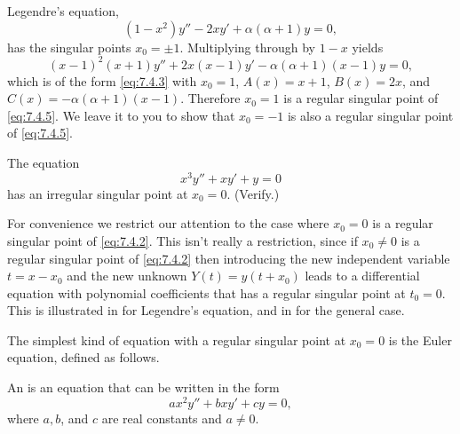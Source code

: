 \begin{example}\label{example:7.4.2}
Legendre's equation,
\begin{equation} \label{eq:7.4.5}
(1-x^2)y''-2xy'+\alpha(\alpha+1)y=0,
\end{equation}
has the singular points $x_0=\pm1$. Multiplying through by $1-x$
yields
\[
(x-1)^2(x+1)y''+2x(x-1)y'-\alpha(\alpha+1)(x-1)y=0,
\]
which is of the form \eqref{eq:7.4.3} with $x_0=1$, $A(x)=x+1$,
$B(x)=2x$, and $C(x)=-\alpha(\alpha+1)(x-1)$. Therefore $x_0=1$
is a regular singular point of \eqref{eq:7.4.5}. We leave it to
you to show that $x_0=-1$ is also a regular singular point of
\eqref{eq:7.4.5}.
\end{example}

\begin{example}\label{example:7.4.3}
The equation
\[
x^3y''+xy'+y=0
\]
has an irregular singular point at $x_0=0$. (Verify.)
\end{example}

For convenience we restrict our attention to the case where $x_0=0$ is
a regular singular point of \eqref{eq:7.4.2}. This isn't  really a
restriction, since if $x_0\ne0$ is a regular singular point of
\eqref{eq:7.4.2} then  introducing the new independent variable $t=x-x_0$
and the new unknown $Y(t)=y(t+x_0)$ leads to a differential equation
with polynomial coefficients that has a regular singular point at
$t_0=0$. This is illustrated in  for Legendre's
equation, and in  for the general case.



The simplest kind of equation with a regular singular point at $x_0=0$
is the Euler equation, defined as follows.

\begin{definition}\label{thmtype:7.4.2}
An
is an equation that can be written in the form
\begin{equation}\label{eq:7.4.6}
ax^2y''+bxy'+cy=0,
\end{equation}
where $a,b$, and $c$ are real constants and $a\ne0$.
\end{definition}

